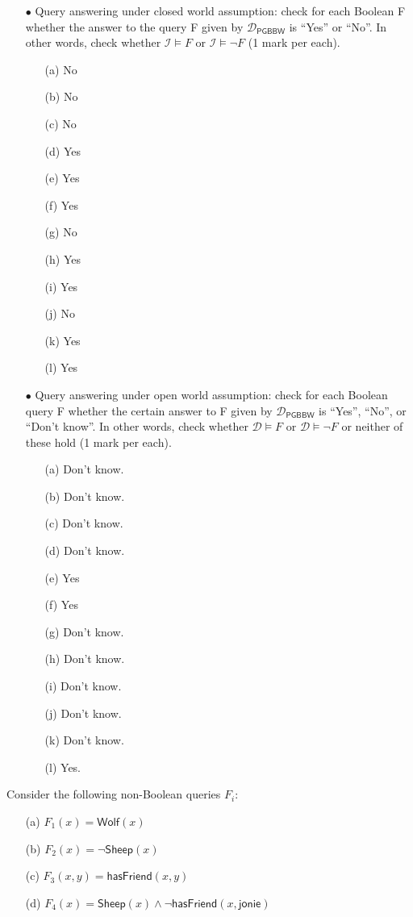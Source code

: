 \documentclass{article}
\begin{document}
\begin{itemize}
\item[$\bullet$] Query answering under closed world assumption: check for each Boolean F whether the answer
to the query F given by $\mathcal{D}_{\textsf{PGBBW}}$ is ``Yes'' or ``No''. In other words, check whether $\mathcal{I}\models F$ or $\mathcal{I}\models\neg F$ (1 mark per each).
\begin{itemize}
    \item[(a)] No
    \item[(b)] No
    \item[(c)] No
    \item[(d)] Yes
    \item[(e)] Yes
    \item[(f)] Yes
    \item[(g)] No
    \item[(h)] Yes
    \item[(i)] Yes
    \item[(j)] No
    \item[(k)] Yes
    \item[(l)] Yes
\end{itemize}
\item[$\bullet$] Query answering under open world assumption: check for each Boolean query F whether the certain answer to F given by $\mathcal{D}_{\textsf{PGBBW}}$ is ``Yes'', ``No'', or ``Don't know''. In other words, check whether $\mathcal{D}\models F$ or $\mathcal{D}\models\neg F$ or neither of these hold (1 mark per each).
    \begin{itemize}
    \item[(a)] Don't know.
    \item[(b)] Don't know.
    \item[(c)] Don't know.
    \item[(d)] Don't know.
    \item[(e)] Yes
    \item[(f)] Yes
    \item[(g)] Don't know.
    \item[(h)] Don't know.
    \item[(i)] Don't know.
    \item[(j)] Don't know.
    \item[(k)] Don't know.
    \item[(l)] Yes.
\end{itemize}
\end{itemize}

Consider the following non-Boolean queries $F_{i}$:

\begin{itemize}
    \item[(a)] $F_{1}(x)=\textsf{Wolf}(x)$
    \item[(b)] $F_{2}(x)=\neg\textsf{Sheep}(x)$
    \item[(c)] $F_{3}(x,y)=\textsf{hasFriend}(x,y)$
    \item[(d)] $F_{4}(x)=\textsf{Sheep}(x)\wedge\neg\textsf{hasFriend}(x,\textsf{jonie})$
\end{itemize}
\end{document}
